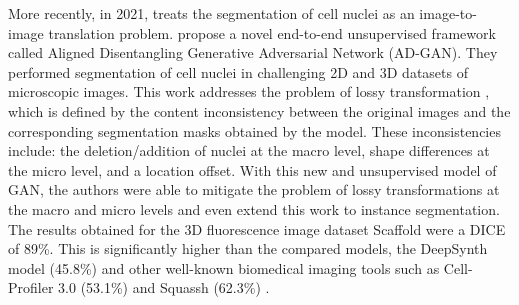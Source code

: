 More recently, in 2021, \cite{adgan} treats the segmentation of cell nuclei as an image-to-image translation problem. \citet{adgan} propose a novel end-to-end unsupervised framework called Aligned Disentangling Generative Adversarial Network (AD-GAN). They performed segmentation of cell nuclei in challenging 2D and 3D datasets of microscopic images. This work addresses the problem of lossy transformation \cite{lossy:cyclegan}, which is defined by the content inconsistency between the original images and the corresponding segmentation masks obtained by the model. These inconsistencies include: the deletion/addition of nuclei at the macro level, shape differences at the micro level, and a location offset. With this new and unsupervised model of GAN, the authors were able to mitigate the problem of lossy transformations at the macro and micro levels and even extend this work to instance segmentation. The results obtained for the 3D fluorescence image dataset Scaffold \cite{dataset} were a DICE of 89\%. This is significantly higher than the compared models, the DeepSynth model \cite{deepsynth} (45.8\%) and other well-known biomedical imaging tools such as Cell-Profiler 3.0 \cite{cellprofiler} (53.1\%) and Squassh (62.3\%) \cite{squassh}.

